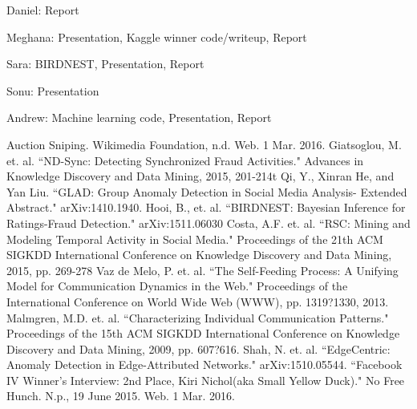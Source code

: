 \documentclass{article} %
\begin{document}
Daniel: Report

Meghana: Presentation, Kaggle winner code/writeup, Report

Sara: BIRDNEST, Presentation, Report

Sonu: Presentation

Andrew: Machine learning code, Presentation, Report

\begin{thebibliography}{123}

 Auction Sniping. Wikimedia Foundation, n.d. Web. 1 Mar. 2016.
 Giatsoglou, M. et. al. ``ND-Sync: Detecting Synchronized Fraud Activities." Advances in Knowledge Discovery and Data Mining, 2015, 201-214t
 Qi, Y., Xinran He, and Yan Liu. ``GLAD: Group Anomaly Detection in Social Media Analysis- Extended Abstract." arXiv:1410.1940.
 Hooi, B., et. al. ``BIRDNEST: Bayesian Inference for Ratings-Fraud Detection." arXiv:1511.06030
 Costa, A.F. et. al. ``RSC: Mining and Modeling Temporal Activity in Social Media." Proceedings of the 21th ACM SIGKDD International Conference on Knowledge Discovery and Data Mining, 2015, pp. 269-278
 Vaz de Melo, P. et. al. ``The Self-Feeding Process: A Unifying Model for Communication Dynamics in the Web." Proceedings of the International Conference on World Wide Web (WWW), pp. 1319?1330, 2013.
 Malmgren, M.D. et. al. ``Characterizing Individual Communication Patterns." Proceedings of the 15th ACM SIGKDD International Conference on Knowledge Discovery and Data Mining, 2009, pp. 607?616.
 Shah, N. et. al. ``EdgeCentric: Anomaly Detection in Edge-Attributed Networks." arXiv:1510.05544.
 ``Facebook IV Winner's Interview: 2nd Place, Kiri Nichol(aka Small Yellow Duck)." No Free Hunch. N.p., 19 June 2015. Web. 1 Mar. 2016.

\end{thebibliography}
\end{document}

